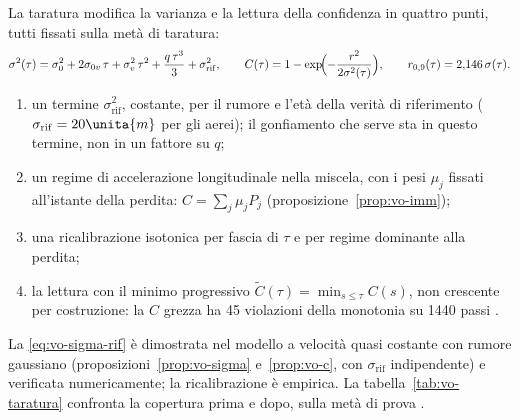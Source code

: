 La taratura modifica la varianza e la lettura della confidenza in quattro punti, tutti fissati sulla metà di taratura:
\begin{equation}\label{eq:vo-sigma-rif}
\sigma^2(\tau)=\sigma_0^2+2\sigma_{0v}\,\tau+\sigma_v^2\,\tau^2+\frac{q\,\tau^3}{3}+\sigma_{\mathrm{rif}}^2,\qquad C(\tau)=1-\exp\!\Bigl(-\frac{r^2}{2\sigma^2(\tau)}\Bigr),\qquad r_{0,9}(\tau)=2{,}146\,\sigma(\tau).
\end{equation}
\begin{enumerate}[label=\arabic*.]
\item un termine $\sigma_{\mathrm{rif}}^2$, costante, per il rumore e l'età della verità di riferimento ($\sigma_{\mathrm{rif}}=20\unita{m}$ per gli aerei); il gonfiamento che serve sta in questo termine, non in un fattore su $q$;
\item un regime di accelerazione longitudinale nella miscela, con i pesi $\mu_j$ fissati all'istante della perdita: $C=\sum_j\mu_jP_j$ (proposizione~\ref{prop:vo-imm});
\item una ricalibrazione isotonica per fascia di $\tau$ e per regime dominante alla perdita;
\item la lettura con il minimo progressivo $\tilde C(\tau)=\min_{s\le\tau}C(s)$, non crescente per costruzione: la $C$ grezza ha 45 violazioni della monotonia su 1440 passi .
\end{enumerate}
La \eqref{eq:vo-sigma-rif} è dimostrata nel modello a velocità quasi costante con rumore gaussiano (proposizioni~\ref{prop:vo-sigma} e~\ref{prop:vo-c}, con $\sigma_{\mathrm{rif}}$ indipendente) e verificata numericamente; la ricalibrazione è empirica. La tabella~\ref{tab:vo-taratura} confronta la copertura prima e dopo, sulla metà di prova .

